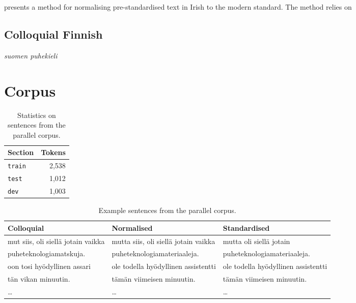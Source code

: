 \documentclass[11pt]{article}
\begin{document}
 presents a method for normalising pre-standardised text in Irish to 
the modern standard. The method relies on 

\subsection{Colloquial Finnish}

 \emph{suomen puhekieli}

\section{Corpus}

\begin{table}
  \centering
 \begin{tabular}{|l|r|}
    \hline
    \textbf{Section} & \textbf{Tokens} \\
    \hline
    \texttt{train} & 2,538 \\
    \texttt{test} & 1,012 \\
    \texttt{dev} & 1,003 \\
    \hline
 \end{tabular} 
  \caption{Statistics on sentences from the parallel corpus.}
  \label{table:corpsize}
\end{table}

\begin{table*}
  \centering
  \begin{tabular}{|l|l|l|}
  \hline
  \textbf{Colloquial} & \textbf{Normalised} & \textbf{Standardised} \\
  \hline
  mut siis, oli siell\"{a} jotain vaikka     & mutta siis, oli siell\"{a} jotain vaikka     & mutta oli siell\"{a} jotain     \\
  puheteknologiamatskuja.  & puheteknologiamateriaaleja. & puheteknologiamateriaaleja.  \\
  \hline
  oon tosi hy\"{o}dyllinen assari     & ole todella hy\"{o}dyllinen assistentti & ole todella hy\"{o}dyllinen assistentti \\
  t\"{a}n vikan minuutin.           & t\"{a}m\"{a}n viimeisen minuutin.            & t\"{a}m\"{a}n viimeisen minuutin. \\
  \hline
  \ldots & \ldots & \ldots \\
  \hline
  \end{tabular}
  \caption{Example sentences from the parallel corpus.}
  \label{table:corpexample}
\end{table*}
\end{document}
